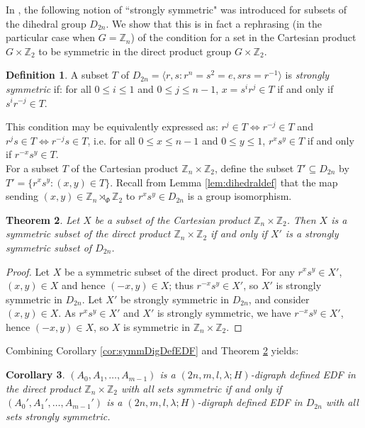 \documentclass[12pt, a4paper]{article}
\newtheorem{theorem}{Theorem}[section]
\newtheorem{corollary}[theorem]{Corollary}
\theoremstyle{definition}
\newtheorem{definition}[theorem]{Definition}
\begin{document}
In \cite{KrePatSti}, the following notion of ``strongly symmetric" was introduced for subsets of the dihedral group $D_{2n}$.  We show that this is in fact a rephrasing (in the particular case when $G=\mathbb{Z}_n$) of the condition for a set in the Cartesian product $G \times \mathbb{Z}_2$ to be symmetric in the direct product group $G \times \mathbb{Z}_2$.
\begin{definition}
A subset $T$ of $D_{2n}=\langle r,s:r^n=s^2=e, srs=r^{-1} \rangle$ is \emph{strongly symmetric} if: for all $0 \leq i \leq 1$ and $0 \leq j \leq n-1$, $x=s^i r^j \in T$ if and only if $s^i r^{-j} \in T$.
\end{definition}
This condition may be equivalently expressed as: $r^j \in T \Leftrightarrow r^{-j} \in T$ and $r^j s \in T \Leftrightarrow r^{-j} s \in T$, i.e.  for all $0 \leq x \leq n-1$ and  $0 \leq y \leq 1$, $r^x s^y \in T$ if and only if $r^{-x} s^y \in T$.  \\
For a subset $T$ of the Cartesian product $\mathbb{Z}_n \times \mathbb{Z}_2$, define the subset $T' \subseteq D_{2n}$ by $T'=\{r^x s^y: (x,y) \in T\}$.  Recall from Lemma \ref{lem:dihedraldef} that the map sending $(x,y) \in \mathbb{Z}_n \rtimes_{\Phi} \mathbb{Z}_2$ to $r^x s^y \in D_{2n}$ is a group isomorphism.
\begin{theorem}\label{thm:sym}
Let $X$ be a subset of the Cartesian product $\mathbb{Z}_n \times \mathbb{Z}_2$.  Then $X$ is a symmetric subset of the direct product $\mathbb{Z}_n \times \mathbb{Z}_2$ if and only if $X'$ is a strongly symmetric subset of $D_{2n}$.
\end{theorem}
\begin{proof}
Let $X$ be a symmetric subset of the direct product. For any $r^x s^y \in X'$, $(x,y) \in X$ and hence $(-x,y) \in X$; thus $r^{-x}s^y \in X'$, so $X'$ is strongly symmetric in $D_{2n}$.
Let $X'$ be strongly symmetric in $D_{2n}$, and consider $(x,y) \in X$. As $r^x s^y \in X'$ and $X'$ is strongly symmetric, we have $r^{-x} s^y\in X'$, hence $(-x,y)\in X$, so $X$ is symmetric in $\mathbb{Z}_n \times \mathbb{Z}_2$.
\end{proof}
Combining Corollary \ref{cor:symmDigDefEDF} and Theorem \ref{thm:sym} yields:
\begin{corollary}\label{cor:stronglysymmetricEDF}
$(A_0,A_1,\ldots, A_{m-1})$ is a $(2n,m,l,\lambda; H)$-digraph defined EDF in the direct product $\mathbb{Z}_n \times \mathbb{Z}_2$ with all sets symmetric if and only if $(A_0',A_1',\ldots, A_{m-1}')$ is a $(2n,m,l,\lambda; H)$-digraph defined EDF in $D_{2n}$ with all sets strongly symmetric.
\end{corollary}
\end{document}
